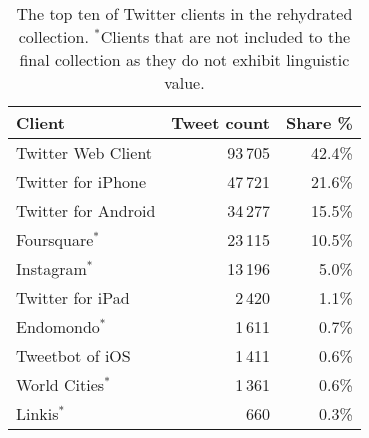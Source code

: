 \begin{table}[h]
  \centering
  \begin{tabular}{lrr}
    \toprule
    Client & Tweet count & Share \% \\
    \midrule
    Twitter Web Client     & 93\,705 &    42.4\% \\
    Twitter for iPhone     & 47\,721 &    21.6\% \\
    Twitter for Android    & 34\,277 &    15.5\% \\
    Foursquare$^*$             & 23\,115 &    10.5\% \\
    Instagram$^*$               & 13\,196 &     5.0\% \\
    Twitter for iPad       & 2\,420  &     1.1\% \\
    Endomondo$^*$               & 1\,611  &     0.7\% \\
    Tweetbot of iOS        & 1\,411  &     0.6\% \\
    World Cities$^*$            & 1\,361  &     0.6\% \\
    Linkis$^*$                  &  660  &     0.3\% \\
    \bottomrule
  \end{tabular}
  \caption{The top ten of Twitter clients in the rehydrated collection. $^*$Clients
    that are not included to the final collection as they do not exhibit
    linguistic value.}
  \label{tab:client-counts}
\end{table}